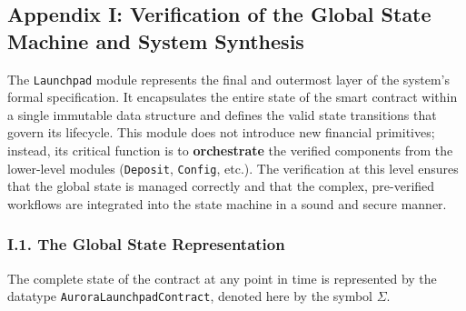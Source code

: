 \documentclass[
  english,
  onecolumn]{article}
\begin{document}
\subsection{Appendix I: Verification of the Global State Machine and
System
Synthesis}\label{appendix-i-verification-of-the-global-state-machine-and-system-synthesis}

The \texttt{Launchpad} module represents the final and outermost layer
of the system's formal specification. It encapsulates the entire state
of the smart contract within a single immutable data structure and
defines the valid state transitions that govern its lifecycle. This
module does not introduce new financial primitives; instead, its
critical function is to \textbf{orchestrate} the verified components
from the lower-level modules (\texttt{Deposit}, \texttt{Config}, etc.).
The verification at this level ensures that the global state is managed
correctly and that the complex, pre-verified workflows are integrated
into the state machine in a sound and secure manner.

\subsubsection{I.1. The Global State
Representation}\label{i.1.-the-global-state-representation}

The complete state of the contract at any point in time is represented
by the datatype \texttt{AuroraLaunchpadContract}, denoted here by the
symbol \(\Sigma\).
\end{document}
